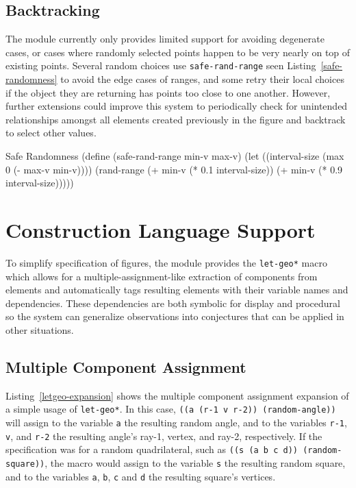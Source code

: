 \subsection{Backtracking}

The module currently only provides limited support for avoiding
degenerate cases, or cases where randomly selected points happen to be
very nearly on top of existing points. Several random choices use
\texttt{safe-rand-range} seen Listing~\ref{safe-randomness} to avoid
the edge cases of ranges, and some retry their local choices if the
object they are returning has points too close to one
another. However, further extensions could improve this system to
periodically check for unintended relationships amongst all elements
created previously in the figure and backtrack to select other values.

\begin{code-listing}
[label=safe-randomness]
{Safe Randomness}
(define (safe-rand-range min-v max-v)
  (let ((interval-size (max 0 (- max-v min-v))))
    (rand-range
     (+ min-v (* 0.1 interval-size))
     (+ min-v (* 0.9 interval-size)))))
\end{code-listing}

\section{Construction Language Support}

To simplify specification of figures, the module provides the
\texttt{let-geo*} macro which allows for a multiple-assignment-like
extraction of components from elements and automatically tags
resulting elements with their variable names and dependencies. These
dependencies are both symbolic for display and procedural so the
system can generalize observations into conjectures that can be
applied in other situations.

\subsection{Multiple Component Assignment}

Listing~\ref{letgeo-expansion} shows the multiple component assignment
expansion of a simple usage of \texttt{let-geo*}. In this case,
\texttt{((a (r-1 v r-2)) (random-angle))} will assign to the variable
\texttt{a} the resulting random angle, and to the variables
\texttt{r-1}, \texttt{v}, and \texttt{r-2} the resulting angle's
ray-1, vertex, and ray-2, respectively. If the specification was for
a random quadrilateral, such as \texttt{((s (a b c d))
  (random-square))}, the macro would assign to the variable \texttt{s}
the resulting random square, and to the variables \texttt{a},
\texttt{b}, \texttt{c} and \texttt{d} the resulting square's vertices.

